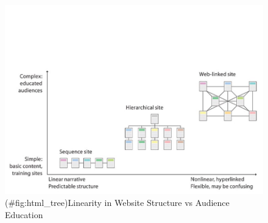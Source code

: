 \documentclass[
  12pt,
  a4paper,
  oneside]{book}
\theoremstyle{definition}
\theoremstyle{definition}
\theoremstyle{definition}
\theoremstyle{remark}
\begin{document}
\begin{figure}
\centering
\includegraphics{images/netstruc_vs_hierstruc.jpg}
\caption{(\#fig:html\_tree)Linearity in Website Structure vs Audience Education}
\end{figure}
\end{document}
